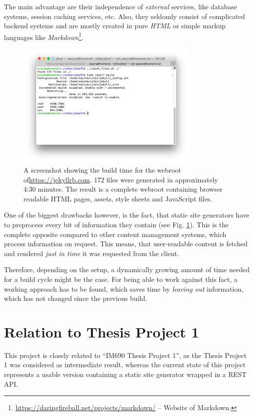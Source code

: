 \documentclass[a4paper,english,11pt]{report}
\begin{document}
The main advantage are their independence of \emph{external} services, like database systems, session caching services, etc. Also, they seldomly consist of complicated backend systems and are mostly created in pure \emph{HTML} or simple markup languages like \emph{Markdown}\footnote{\url{https://daringfireball.net/projects/markdown/} -- Website of Markdown.}.
%
\begin{figure}[t]
    \centering
    \includegraphics[width=0.8\textwidth]{jekyll_build.png}
    \caption{A screenshot showing the build time for the webroot of\newline \url{https://jekyllrb.com}. 172 files were generated in approximately 4:30 minutes. The result is a complete webroot containing browser readable HTML pages, assets, style sheets and JavaScript files.}
    \label{fig:jekyll_build}
\end{figure}
%

One of the biggest drawbacks however, is the fact, that static site generators have to preprocess every bit of information they contain (see Fig. \ref{fig:jekyll_build}). This is the complete opposite compared to other content management systems, which process information on request. This means, that user-readable content is fetched and rendered \emph{just in time} it was requested from the client.

Therefore, depending on the setup, a dynamically growing amount of time needed for a build cycle might be the case. For being able to work against this fact, a working approach has to be found, which saves time by \emph{leaving out} information, which has not changed since the previous build.

\section{Relation to Thesis Project 1}
\label{sec:relation-project}
This project is closely related to ``IM690 Thesis Project 1'', as the Thesis Project 1 was considered as intermediate result, whereas the current state of this project represents a usable version containing a static site generator wrapped in a REST API.
\end{document}
